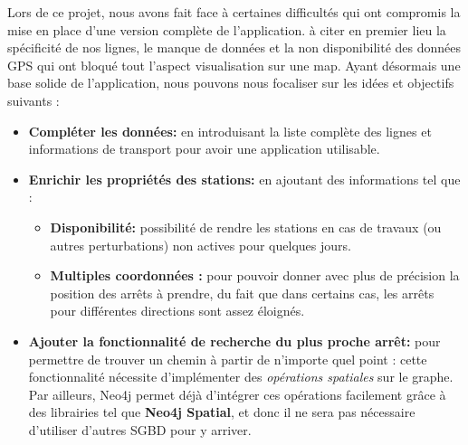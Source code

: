 Lors de ce projet, nous avons fait face à certaines difficultés qui ont compromis la mise en place d'une version complète de l'application. à citer en premier lieu la spécificité de nos lignes, le manque de données et la non disponibilité des données GPS qui ont bloqué tout l'aspect visualisation sur une map.\newline\newline
Ayant désormais une base solide de l'application, nous pouvons nous focaliser sur les idées et objectifs suivants :
\begin{itemize}
	\item \textbf{Compléter les données:} en introduisant la liste complète des lignes et informations de transport pour avoir une application utilisable.
	
	\item \textbf{Enrichir les propriétés des stations: }en ajoutant des informations tel que :
		\begin{itemize}
			\item \textbf{Disponibilité:} possibilité de rendre les stations en cas de travaux (ou autres perturbations) non actives pour quelques jours.
			\item \textbf{Multiples coordonnées :} pour pouvoir donner avec plus de précision la position des arrêts à prendre, du fait que dans certains cas, les arrêts pour différentes directions sont assez éloignés.
		\end{itemize}
		
	\item \textbf{Ajouter la fonctionnalité de recherche du plus proche arrêt: } pour permettre de trouver un chemin à partir de n'importe quel point : cette fonctionnalité nécessite d'implémenter des \emph{opérations spatiales} sur le graphe. Par ailleurs, Neo4j permet déjà d'intégrer ces opérations facilement grâce à des librairies tel que \textbf{Neo4j Spatial}, et donc il ne sera pas nécessaire d'utiliser d'autres SGBD pour y arriver.


\end{itemize}
